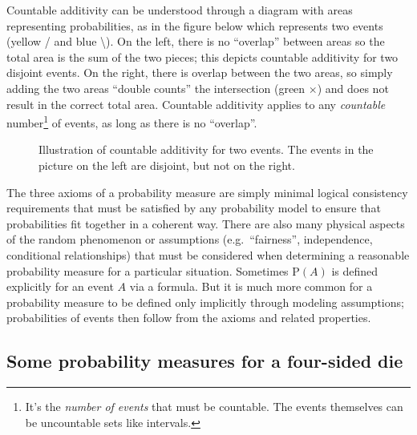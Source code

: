 \documentclass[
  letterpaper,
  DIV=11,
  numbers=noendperiod]{scrreprt}
\theoremstyle{plain}
\theoremstyle{definition}
\theoremstyle{definition}
\theoremstyle{definition}
\theoremstyle{remark}
\begin{document}
Countable additivity can be understood through a diagram with areas
representing probabilities, as in the figure below which represents two
events (yellow / and blue \textbackslash). On the left, there is no
``overlap'' between areas so the total area is the sum of the two
pieces; this depicts countable additivity for two disjoint events. On
the right, there is overlap between the two areas, so simply adding the
two areas ``double counts'' the intersection (green \(\times\)) and does
not result in the correct total area. Countable additivity applies to
any \emph{countable} number\footnote{It's the \emph{number of events}
  that must be countable. The events themselves can be uncountable sets
  like intervals.} of events, as long as there is no ``overlap''.

\begin{figure}


\caption{\label{fig-venn-disjoint}Illustration of countable additivity
for two events. The events in the picture on the left are disjoint, but
not on the right.}

\end{figure}%

The three axioms of a probability measure are simply minimal logical
consistency requirements that must be satisfied by any probability model
to ensure that probabilities fit together in a coherent way. There are
also many physical aspects of the random phenomenon or assumptions
(e.g.~``fairness'', independence, conditional relationships) that must
be considered when determining a reasonable probability measure for a
particular situation. Sometimes \(\textrm{P}(A)\) is defined explicitly
for an event \(A\) via a formula. But it is much more common for a
probability measure to be defined only implicitly through modeling
assumptions; probabilities of events then follow from the axioms and
related properties.

\subsection{Some probability measures for a four-sided
die}\label{some-probability-measures-for-a-four-sided-die}
\end{document}
